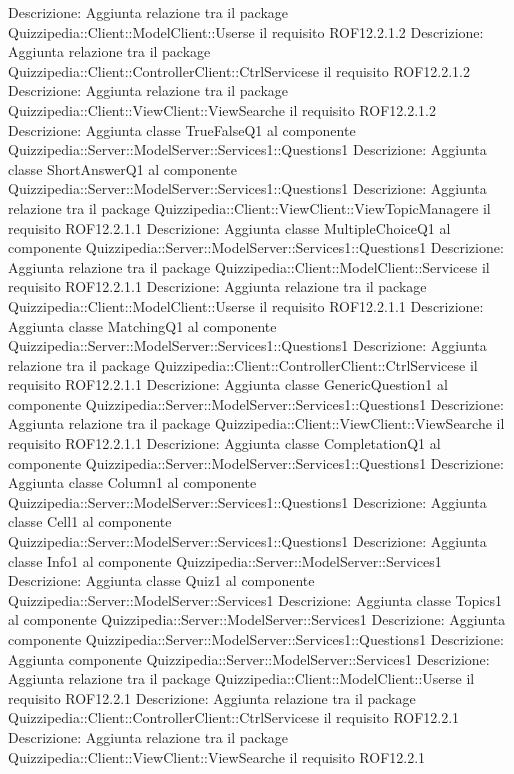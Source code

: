 Descrizione: Aggiunta relazione tra il package Quizzipedia::Client::ModelClient::Userse il requisito ROF12.2.1.2 
Descrizione: Aggiunta relazione tra il package Quizzipedia::Client::ControllerClient::CtrlServicese il requisito ROF12.2.1.2 
Descrizione: Aggiunta relazione tra il package Quizzipedia::Client::ViewClient::ViewSearche il requisito ROF12.2.1.2 
Descrizione: Aggiunta classe TrueFalseQ1 al componente Quizzipedia::Server::ModelServer::Services1::Questions1 
Descrizione: Aggiunta classe ShortAnswerQ1 al componente Quizzipedia::Server::ModelServer::Services1::Questions1 
Descrizione: Aggiunta relazione tra il package Quizzipedia::Client::ViewClient::ViewTopicManagere il requisito ROF12.2.1.1 
Descrizione: Aggiunta classe MultipleChoiceQ1 al componente Quizzipedia::Server::ModelServer::Services1::Questions1 
Descrizione: Aggiunta relazione tra il package Quizzipedia::Client::ModelClient::Servicese il requisito ROF12.2.1.1 
Descrizione: Aggiunta relazione tra il package Quizzipedia::Client::ModelClient::Userse il requisito ROF12.2.1.1 
Descrizione: Aggiunta classe MatchingQ1 al componente Quizzipedia::Server::ModelServer::Services1::Questions1 
Descrizione: Aggiunta relazione tra il package Quizzipedia::Client::ControllerClient::CtrlServicese il requisito ROF12.2.1.1 
Descrizione: Aggiunta classe GenericQuestion1 al componente Quizzipedia::Server::ModelServer::Services1::Questions1 
Descrizione: Aggiunta relazione tra il package Quizzipedia::Client::ViewClient::ViewSearche il requisito ROF12.2.1.1 
Descrizione: Aggiunta classe CompletationQ1 al componente Quizzipedia::Server::ModelServer::Services1::Questions1 
Descrizione: Aggiunta classe Column1 al componente Quizzipedia::Server::ModelServer::Services1::Questions1 
Descrizione: Aggiunta classe Cell1 al componente Quizzipedia::Server::ModelServer::Services1::Questions1 
Descrizione: Aggiunta classe Info1 al componente Quizzipedia::Server::ModelServer::Services1 
Descrizione: Aggiunta classe Quiz1 al componente Quizzipedia::Server::ModelServer::Services1 
Descrizione: Aggiunta classe Topics1 al componente Quizzipedia::Server::ModelServer::Services1 
Descrizione: Aggiunta componente Quizzipedia::Server::ModelServer::Services1::Questions1 
Descrizione: Aggiunta componente Quizzipedia::Server::ModelServer::Services1 
Descrizione: Aggiunta relazione tra il package Quizzipedia::Client::ModelClient::Userse il requisito ROF12.2.1 
Descrizione: Aggiunta relazione tra il package Quizzipedia::Client::ControllerClient::CtrlServicese il requisito ROF12.2.1 
Descrizione: Aggiunta relazione tra il package Quizzipedia::Client::ViewClient::ViewSearche il requisito ROF12.2.1 
